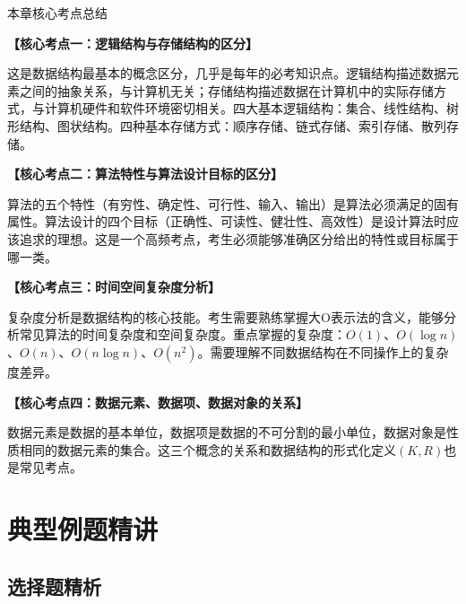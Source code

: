 \documentclass[12pt, a4paper]{article}
\newenvironment{bluebox}{\begin{framed}\begin{minipage}{\textwidth}}{\end{minipage}\end{framed}}
\begin{document}
\begin{bluebox}{本章核心考点总结}

	\textbf{【核心考点一：逻辑结构与存储结构的区分】}

	这是数据结构最基本的概念区分，几乎是每年的必考知识点。逻辑结构描述数据元素之间的抽象关系，与计算机无关；存储结构描述数据在计算机中的实际存储方式，与计算机硬件和软件环境密切相关。四大基本逻辑结构：集合、线性结构、树形结构、图状结构。四种基本存储方式：顺序存储、链式存储、索引存储、散列存储。

	\textbf{【核心考点二：算法特性与算法设计目标的区分】}

	算法的五个特性（有穷性、确定性、可行性、输入、输出）是算法必须满足的固有属性。算法设计的四个目标（正确性、可读性、健壮性、高效性）是设计算法时应该追求的理想。这是一个高频考点，考生必须能够准确区分给出的特性或目标属于哪一类。

	\textbf{【核心考点三：时间空间复杂度分析】}

	复杂度分析是数据结构的核心技能。考生需要熟练掌握大O表示法的含义，能够分析常见算法的时间复杂度和空间复杂度。重点掌握的复杂度：$O(1)$、$O(\log n)$、$O(n)$、$O(n \log n)$、$O(n^2)$。需要理解不同数据结构在不同操作上的复杂度差异。

	\textbf{【核心考点四：数据元素、数据项、数据对象的关系】}

	数据元素是数据的基本单位，数据项是数据的不可分割的最小单位，数据对象是性质相同的数据元素的集合。这三个概念的关系和数据结构的形式化定义$(K,R)$也是常见考点。
\end{bluebox}

\section{典型例题精讲}

\subsection{选择题精析}
\end{document}
